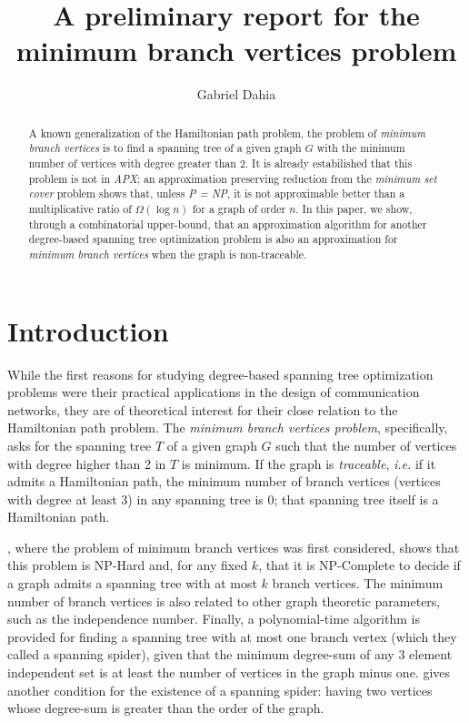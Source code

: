 \documentclass[12pt]{article}
\title{A preliminary report for the minimum branch vertices problem}
\author{Gabriel Dahia\inst{1}}
\begin{document}
 

\maketitle

\begin{abstract}
  A known generalization of the Hamiltonian path problem, the problem of \emph{minimum branch vertices} is to find a spanning tree of a given graph $G$ with the minimum number of vertices with degree greater than 2.
  It is already estabilished that this problem is not in \emph{APX}; an approximation preserving reduction from the \emph{minimum set cover} problem shows that, unless \emph{P = NP}, it is not approximable better than a multiplicative ratio of $\Omega(\log n )$ for a graph of order $n$.
  In this paper, we show, through a combinatorial upper-bound, that an approximation algorithm for another degree-based spanning tree optimization problem is also an approximation for \emph{minimum branch vertices} when the graph is non-traceable.
\end{abstract}
     
\section{Introduction}

While the first reasons for studying degree-based spanning tree optimization problems were their practical applications in the design of communication networks, they are of theoretical interest for their close relation to the Hamiltonian path problem.
The \emph{minimum branch vertices problem}, specifically, asks for the spanning tree $T$ of a given graph $G$ such that the number of vertices with degree higher than 2 in $T$ is minimum.
If the graph is \emph{traceable}, \emph{i.e.} if it admits a Hamiltonian path, the minimum number of branch vertices (vertices with degree at least 3) in any spanning tree is 0; that spanning tree itself is a Hamiltonian path.

\cite{gargano2004}, where the problem of minimum branch vertices was first considered, shows that this problem is NP-Hard and, for any fixed $k$, that it is NP-Complete to decide if a graph admits a spanning tree with at most $k$ branch vertices. 
The minimum number of branch vertices is also related to other graph theoretic parameters, such as the independence number.
Finally, a polynomial-time algorithm is provided for finding a spanning tree with at most one branch vertex (which they called a spanning spider), given that the minimum degree-sum of any 3 element independent set is at least the number of vertices in the graph minus one.
\cite{flandrin2008} gives another condition for the existence of a spanning spider: having two vertices whose degree-sum is greater than the order of the graph. 
\end{document}

